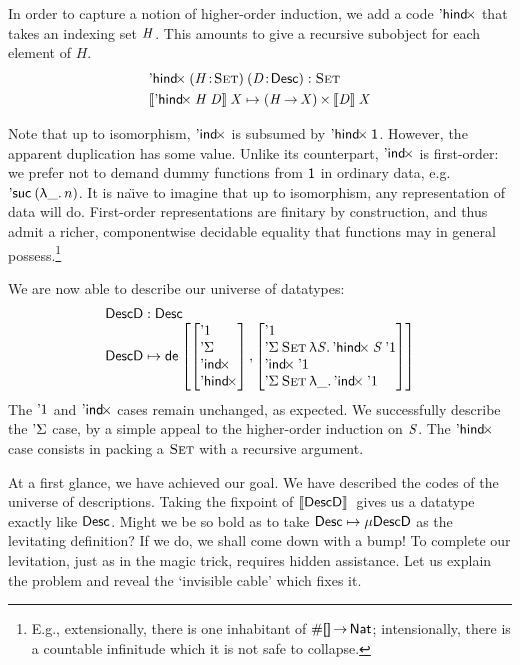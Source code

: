 In order to capture a notion of higher-order induction, we add a code
$\SYMBDHindx$ that takes an indexing set $\V{H}$. This amounts to give
a recursive subobject for each element of $H$.
%
\[\stk{
    \DHindx{(\Bhab{\M{H}}{\Set})}{(\Bhab{\M{D}}{\Desc})} : \Set \smallskip \\
\descop{\DHindx{\V{H}}{\V{D}}}{\V{X}}     \mapsto \TIMES{(\V{H} \To \V{X})}{\descop{\V{D}}{\V{X}}} \\
}\]


Note that up to isomorphism, $\SYMBDIndx$ is subsumed by
$\DHindx{\Unit}{\!}$. However, the apparent duplication has some
value.  Unlike its counterpart, $\SYMBDIndx$ is first-order: we prefer
not to demand dummy functions from \(\Unit\) in ordinary data,
e.g. \(\NatSuc{(\LAM{\_}n)}\). It is na{\"\i}ve to imagine that up to
isomorphism, any representation of data will do.  First-order
representations are finitary by construction, and thus admit a richer,
componentwise decidable equality that functions may in
general possess.\footnote{E.g., extensionally, there is one inhabitant of
\(\EnumT{\void}\To\Nat\); intensionally, there is a countable infinitude
which it is not safe to collapse.}

We are now able to describe our universe of datatypes:
%
\[\stk{
\DescD : \Desc \\
\DescD \mapsto\tada
{\stkm{ \DUnit\\ \SYMBDSigma\\ \SYMBDIndx\\ \SYMBDHindx}}
{\stkm{
\DUnit                                            \\
                                   \DSigma{\Set}{\LAM{\V{S}} \DHindx{\V{S}}{\DUnit}}   \\
                                   \DIndx{\DUnit}                                    \\
                                   \DSigma{\Set}{\LAM{\_} \DIndx{\DUnit}}
}}
}\]
%
The $\DUnit$ and $\SYMBDIndx$ cases remain unchanged, as expected. We
successfully describe the $\SYMBDSigma$ case, by a simple appeal to
the higher-order induction on $\V{S}$. The $\SYMBDHindx$ case
consists in packing a $\Set$ with a recursive argument.

At a first glance, we have achieved our goal. We have described the
codes of the universe of descriptions. Taking the fixpoint of \(\descop{\DescD}\)
gives us a datatype exactly like $\Desc$. Might we be
so bold as to take \(\Desc \mapsto \Mu{\DescD}\) as the levitating
definition? If we do, we shall come down with a bump! 
To complete our levitation, just as in the magic trick, requires
hidden assistance. Let us explain the problem and reveal the `invisible
cable' which fixes it.


